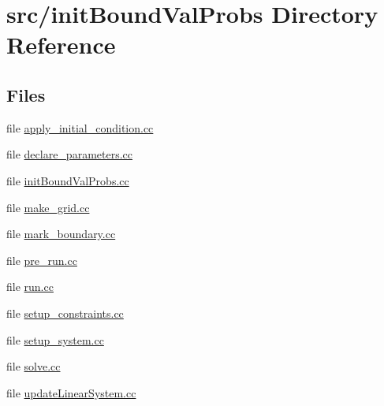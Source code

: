 \section{src/init\+Bound\+Val\+Probs Directory Reference}
\label{dir_2d09604be94b4570660f815b8c136696}
\subsection*{Files}
\begin{DoxyCompactItemize}
\item 
file \mbox{\hyperlink{apply__initial__condition_8cc}{apply\+\_\+initial\+\_\+condition.\+cc}}
\item 
file \mbox{\hyperlink{init_bound_val_probs_2declare__parameters_8cc}{declare\+\_\+parameters.\+cc}}
\item 
file \mbox{\hyperlink{init_bound_val_probs_8cc}{init\+Bound\+Val\+Probs.\+cc}}
\item 
file \mbox{\hyperlink{make__grid_8cc}{make\+\_\+grid.\+cc}}
\item 
file \mbox{\hyperlink{mark__boundary_8cc}{mark\+\_\+boundary.\+cc}}
\item 
file \mbox{\hyperlink{pre__run_8cc}{pre\+\_\+run.\+cc}}
\item 
file \mbox{\hyperlink{run_8cc}{run.\+cc}}
\item 
file \mbox{\hyperlink{setup__constraints_8cc}{setup\+\_\+constraints.\+cc}}
\item 
file \mbox{\hyperlink{setup__system_8cc}{setup\+\_\+system.\+cc}}
\item 
file \mbox{\hyperlink{solve_8cc}{solve.\+cc}}
\item 
file \mbox{\hyperlink{update_linear_system_8cc}{update\+Linear\+System.\+cc}}
\end{DoxyCompactItemize}
